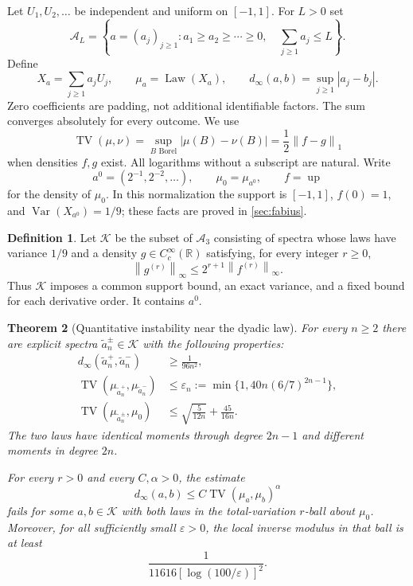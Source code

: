 \documentclass[11pt,a4paper]{article}
\newtheorem{theorem}{Theorem}[section]
\theoremstyle{definition}
\newtheorem{definition}[theorem]{Definition}
\theoremstyle{remark}
\DeclareMathOperator{\TV}{TV}
\DeclareMathOperator{\Law}{Law}
\DeclareMathOperator{\Var}{Var}
\newcommand{\R}{\mathbb R}
\newcommand{\A}{\mathcal A}
\newcommand{\K}{\mathcal K}
\newcommand{\eps}{\varepsilon}
\newcommand{\norm}[1]{\left\lVert #1\right\rVert}
\newcommand{\up}{\operatorname{up}}
\begin{document}
Let $U_1,U_2,\ldots$ be independent and uniform on $[-1,1]$. For $L>0$ set
\[
 \A_L=\left\{a=(a_j)_{j\ge1}:a_1\ge a_2\ge\cdots\ge0,
                 \quad\sum_{j\ge1}a_j\le L\right\}.
\]
Define
\[
 X_a=\sum_{j\ge1}a_jU_j,\qquad \mu_a=\Law(X_a),\qquad
 d_\infty(a,b)=\sup_{j\ge1}|a_j-b_j|.
\]
Zero coefficients are padding, not additional identifiable factors. The sum
converges absolutely for every outcome. We use
\[
 \TV(\mu,\nu)=\sup_{B\text{ Borel}}|\mu(B)-\nu(B)|
             =\frac12\norm{f-g}_1
\]
when densities $f,g$ exist. All logarithms without a subscript are natural.
Write
\[
 a^0=(2^{-1},2^{-2},\ldots),\qquad \mu_0=\mu_{a^0},\qquad f=\up
\]
for the density of $\mu_0$. In this normalization the support is $[-1,1]$,
$f(0)=1$, and $\Var(X_{a^0})=1/9$; these facts are proved in
\cref{sec:fabius}.

\begin{definition}\label{def:K}
Let $\K$ be the subset of $\A_3$ consisting of spectra whose laws have
variance $1/9$ and a density $g\in C_c^\infty(\R)$ satisfying, for every
integer $r\ge0$,
\[
 \norm{g^{(r)}}_\infty\le 2^{r+1}\norm{f^{(r)}}_\infty.
\]
Thus $\K$ imposes a common support bound, an exact variance, and a fixed
bound for each derivative order. It contains $a^0$.
\end{definition}

\begin{theorem}[Quantitative instability near the dyadic law]
\label{thm:main}
For every $n\ge2$ there are explicit spectra $\widetilde a_n^\pm\in\K$
with the following properties:
\begin{align}
 d_\infty(\widetilde a_n^+,\widetilde a_n^-)&\ge\frac1{96n^2},
                                                    \label{eq:main-gap}\\
 \TV(\mu_{\widetilde a_n^+},\mu_{\widetilde a_n^-})
     &\le \eps_n:=\min\{1,40n(6/7)^{2n-1}\},          \label{eq:main-tv}\\
 \TV(\mu_{\widetilde a_n^\pm},\mu_0)
     &\le \sqrt{\frac5{12n}}+\frac{45}{16n}.           \label{eq:main-near}
\end{align}
The two laws have identical moments through degree $2n-1$ and different
moments in degree $2n$.

For every $r>0$ and every $C,\alpha>0$, the estimate
\[
 d_\infty(a,b)\le C\TV(\mu_a,\mu_b)^\alpha
\]
fails for some $a,b\in\K$ with both laws in the total-variation $r$-ball
about $\mu_0$. Moreover, for all sufficiently small $\eps>0$, the local
inverse modulus in that ball is at least
\[
 \frac{1}{11616[\log(100/\eps)]^2}.
\]
\end{theorem}
\end{document}
